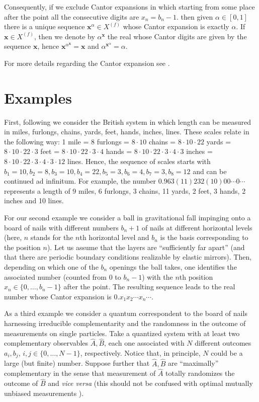 \documentclass[11pt,a4paper,twoside]{article}
\newcommand{\x}{{\mathbf x}}
\def \XF  {X^{(f)}}
\begin{document}
Consequently, if we exclude Cantor expansions in which starting from some
place after the point all the consecutive digits are $x_n = b_n -1$. then
given $\alpha \in [0,1]$ there is a unique sequence $\x^{\alpha}\in \XF$
whose Cantor expansion is exactly $\alpha$. If $\x \in \XF$, then we denote
by $\alpha^{\x}$ the real whose Cantor digits are given by the sequence
$\x$, hence $\x^{\alpha^{\x}} = \x$ and $ \alpha^{\x^{\alpha}}
 = \alpha$.

For more
details regarding the Cantor expansion see \cite{hw, drobot}.

\section{Examples}

First, following \cite{drobot}  we consider the British system in which
length can be measured in miles, furlongs, chains, yards, feet, hands,
inches, lines. These scales relate in the following way:  1 mile = 8
furlongs = $8 \cdot 10$ chains =
$8 \cdot 10 \cdot 22$ yards =  $8 \cdot 10 \cdot 22 \cdot 3$ feet = $8 \cdot
10 \cdot 22 \cdot 3
\cdot 4$ hands = $8 \cdot 10 \cdot 22 \cdot 3
\cdot 4 \cdot 3$ inches  =  $8 \cdot 10 \cdot 22 \cdot 3
\cdot 4 \cdot 3 \cdot 12$ lines. Hence,  the sequence of  scales starts with
$b_1 = 10, b_2 = 8, b_3 = 10, b_4 = 22,  b_5 = 3, b_6 = 4, b_7 =3, b_8 = 12$
and can be continued ad infinitum.  For example,  the number $0.963
(11)232(10)00\cdots 0 \cdots$
represents a length of 9 miles, 6 furlongs, 3 chains, 11 yards, 2 feet, 3
hands,  2 inches and 10 lines.



For our second example we consider a ball in gravitational fall
impinging onto a  board of nails with different numbers
$ b_n+1$ of nails
at different horizontal levels
(here, $n$ stands for the $n$th horizontal level
and $b_n$ is the basis corresponding to the position $n$).
Let us assume that the layers are ``sufficiently far apart''
(and that there are periodic boundary conditions realizable by
elastic mirrors).
Then, depending on which one of the $b_n$ openings the ball takes,
one identifies the associated number
(counted from $0$ to $b_n-1$) with
the $n$th position  $x_n \in \{0,\ldots ,b_n-1\}$ after the point.
The resulting sequence leads to the real number  whose Cantor expansion
is $0.x_1x_2\cdots x_n \cdots $.




As a third example we consider a quantum correspondent to the  board of
nails
harnessing irreducible complementarity and the randomness  in the outcome of
measurements on single  particles.
Take a quantized system with at least two  complementary
observables
$\hat{A},\hat{B}$,
each one associated with $N$ different outcomes $a_i,b_j$, $i,j \in
\{0,\ldots ,N-1\}$, respectively.
Notice that, in principle, $N$ could be a large (but finite) number.
Suppose further that $\hat{A},\hat{B}$ are ``maximally''  complementary
in the sense that measurement of $\hat{A}$ totally randomizes the outcome
of $\hat{B}$ and {\it vice versa}
(this should not be confused with optimal mutually unbiased measurements
\cite{WooFie}).
\end{document}

